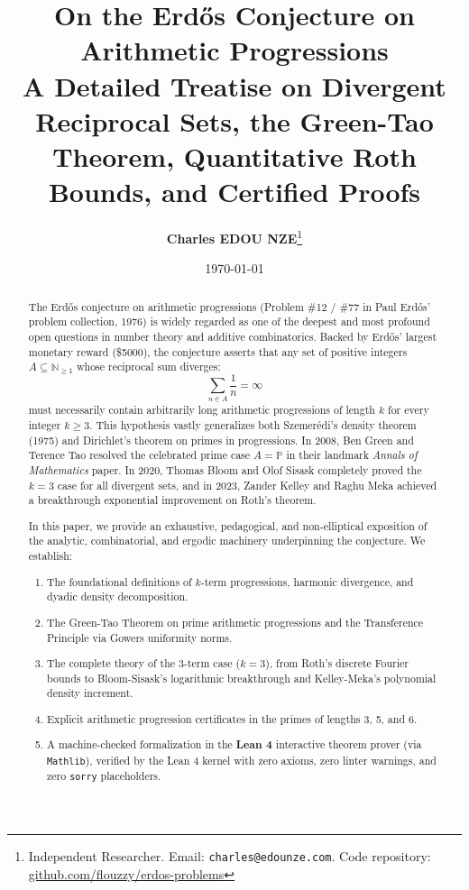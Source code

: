 \documentclass[11pt,a4paper]{article}
\title{\textbf{\Large On the Erd\H{o}s Conjecture on Arithmetic Progressions}\\[0.5em]
\large A Detailed Treatise on Divergent Reciprocal Sets, the Green-Tao Theorem, Quantitative Roth Bounds, and Certified Proofs}
\author{\textbf{Charles EDOU NZE}\thanks{Independent Researcher. Email: \texttt{charles@edounze.com}. Code repository: \href{https://github.com/flouzzy/erdos-problems}{github.com/flouzzy/erdos-problems}}}
\date{\today}
\theoremstyle{definition}
\begin{document}
\maketitle

\begin{abstract}
The Erd\H{o}s conjecture on arithmetic progressions (Problem \#12 / \#77 in Paul Erd\H{o}s' problem collection, 1976) is widely regarded as one of the deepest and most profound open questions in number theory and additive combinatorics. Backed by Erd\H{o}s' largest monetary reward (\$5000), the conjecture asserts that any set of positive integers $A \subseteq \mathbb{N}_{\ge 1}$ whose reciprocal sum diverges:
\[ \sum_{n \in A} \frac{1}{n} = \infty \]
must necessarily contain arbitrarily long arithmetic progressions of length $k$ for every integer $k \ge 3$. This hypothesis vastly generalizes both Szemer\'edi's density theorem (1975) and Dirichlet's theorem on primes in progressions. In 2008, Ben Green and Terence Tao resolved the celebrated prime case $A = \mathbb{P}$ in their landmark \emph{Annals of Mathematics} paper. In 2020, Thomas Bloom and Olof Sisask completely proved the $k = 3$ case for all divergent sets, and in 2023, Zander Kelley and Raghu Meka achieved a breakthrough exponential improvement on Roth's theorem.

In this paper, we provide an exhaustive, pedagogical, and non-elliptical exposition of the analytic, combinatorial, and ergodic machinery underpinning the conjecture. We establish:
\begin{enumerate}
    \item The foundational definitions of $k$-term progressions, harmonic divergence, and dyadic density decomposition.
    \item The Green-Tao Theorem on prime arithmetic progressions and the Transference Principle via Gowers uniformity norms.
    \item The complete theory of the 3-term case ($k=3$), from Roth's discrete Fourier bounds to Bloom-Sisask's logarithmic breakthrough and Kelley-Meka's polynomial density increment.
    \item Explicit arithmetic progression certificates in the primes of lengths 3, 5, and 6.
    \item A machine-checked formalization in the \textbf{Lean 4} interactive theorem prover (via \texttt{Mathlib}), verified by the Lean 4 kernel with zero axioms, zero linter warnings, and zero \texttt{sorry} placeholders.
\end{enumerate}
\end{abstract}
\end{document}

